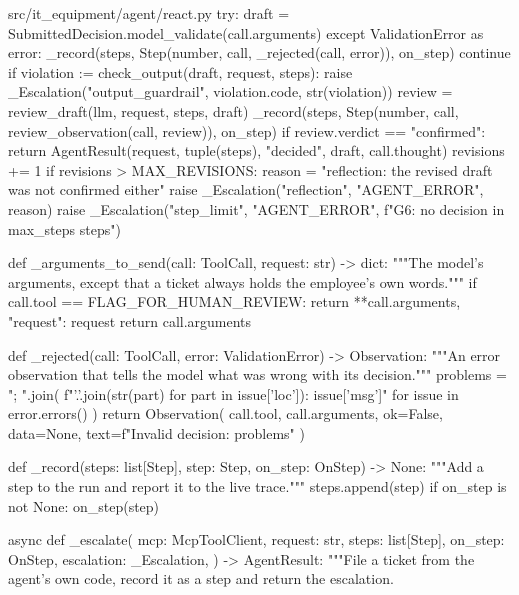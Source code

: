 \documentclass[11pt,letterpaper]{article}
\renewcommand{\_}{\textunderscore\allowbreak}
\begin{document}
\begin{codebox}{src/it_equipment/agent/react.py}
            try:
                draft = SubmittedDecision.model_validate(call.arguments)
            except ValidationError as error:
                _record(steps, Step(number, call, _rejected(call, error)), on_step)
                continue
            if violation := check_output(draft, request, steps):
                raise _Escalation("output_guardrail", violation.code, str(violation))
            review = review_draft(llm, request, steps, draft)
            _record(steps, Step(number, call, review_observation(call, review)), on_step)
            if review.verdict == "confirmed":
                return AgentResult(request, tuple(steps), "decided", draft, call.thought)
            revisions += 1
            if revisions > MAX_REVISIONS:
                reason = "reflection: the revised draft was not confirmed either"
                raise _Escalation("reflection", "AGENT_ERROR", reason)
    raise _Escalation("step_limit", "AGENT_ERROR", f"G6: no decision in {max_steps} steps")


def _arguments_to_send(call: ToolCall, request: str) -> dict:
    """The model's arguments, except that a ticket always holds the employee's own words."""
    if call.tool == FLAG_FOR_HUMAN_REVIEW:
        return {**call.arguments, "request": request}
    return call.arguments


def _rejected(call: ToolCall, error: ValidationError) -> Observation:
    """An error observation that tells the model what was wrong with its decision."""
    problems = "; ".join(
        f"{'.'.join(str(part) for part in issue['loc'])}: {issue['msg']}"
        for issue in error.errors()
    )
    return Observation(
        call.tool, call.arguments, ok=False, data=None, text=f"Invalid decision: {problems}"
    )


def _record(steps: list[Step], step: Step, on_step: OnStep) -> None:
    """Add a step to the run and report it to the live trace."""
    steps.append(step)
    if on_step is not None:
        on_step(step)


async def _escalate(
    mcp: McpToolClient,
    request: str,
    steps: list[Step],
    on_step: OnStep,
    escalation: _Escalation,
) -> AgentResult:
    """File a ticket from the agent's own code, record it as a step and return the escalation.


\end{codebox}
\end{document}
